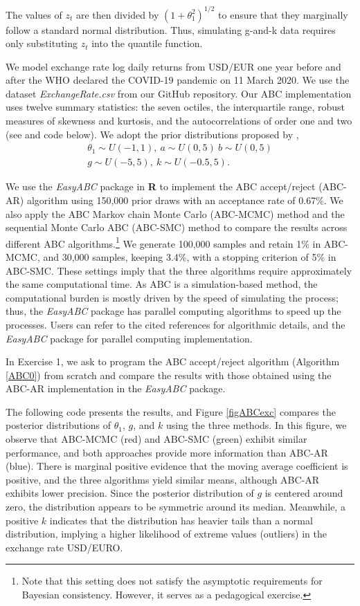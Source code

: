 The values of \(z_t\) are then divided by \((1+\theta_1^2)^{1/2}\) to ensure that they marginally follow a standard normal distribution. Thus, simulating g-and-k data requires only substituting \(z_t\) into the quantile function.  

We model exchange rate log daily returns from USD/EUR one year before and after the WHO declared the COVID-19 pandemic on 11 March 2020. We use the dataset \textit{ExchangeRate.csv} from our GitHub repository. Our ABC implementation uses twelve summary statistics: the seven octiles, the interquartile range, robust measures of skewness and kurtosis, and the autocorrelations of order one and two (see \cite{drovandi2011likelihood} and code below). We adopt the prior distributions proposed by \cite{ramirez2024testing}, 
\begin{align*}
	\theta_1\sim U(-1,1), \ a\sim U(0,5) \ b\sim U(0,5)\\
	g\sim U(-5,5), \ k\sim U(-0.5, 5).
\end{align*}

We use the \textit{EasyABC} package in \textbf{R} to implement the ABC accept/reject (ABC-AR) algorithm using 150,000 prior draws with an acceptance rate of 0.67\%. We also apply the ABC Markov chain Monte Carlo (ABC-MCMC) method \cite{marjoram2003markov} and the sequential Monte Carlo ABC (ABC-SMC) method \cite{lenormand2013adaptive} to compare the results across different ABC algorithms.\footnote{Note that this setting does not satisfy the asymptotic requirements for Bayesian consistency. However, it serves as a pedagogical exercise.} We generate 100,000 samples and retain 1\% in ABC-MCMC, and 30,000 samples, keeping 3.4\%, with a stopping criterion of 5\% in ABC-SMC. These settings imply that the three algorithms require approximately the same computational time. As ABC is a simulation-based method, the computational burden is mostly driven by the speed of simulating the process; thus, the \textit{EasyABC} package has parallel computing algorithms to speed up the processes. Users can refer to the cited references for algorithmic details, and the \textit{EasyABC} package for parallel computing implementation. 

In Exercise 1, we ask to program the ABC accept/reject algorithm (Algorithm \ref{ABC0}) from scratch and compare the results with those obtained using the ABC-AR implementation in the \textit{EasyABC} package.

The following code presents the results, and Figure \ref{figABCexc} compares the posterior distributions of $\theta_1$, $g$, and $k$ using the three methods. In this figure, we observe that ABC-MCMC (red) and ABC-SMC (green) exhibit similar performance, and both approaches provide more information than ABC-AR (blue). There is marginal positive evidence that the moving average coefficient is positive, and the three algorithms yield similar means, although ABC-AR exhibits lower precision. Since the posterior distribution of $g$ is centered around zero, the distribution appears to be symmetric around its median. Meanwhile, a positive $k$ indicates that the distribution has heavier tails than a normal distribution, implying a higher likelihood of extreme values (outliers) in the exchange rate USD/EURO.

